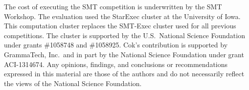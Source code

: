 \documentclass[smallcondensed]{svjour3}
\begin{document}
\begin{acknowledgements} 
 
The cost of executing the SMT competition is underwritten by the SMT
Workshop.  The evaluation used the StarExec cluster at the University
of Iowa.  This computation cluster replaces the SMT-Exec cluster used
for all previous competitions.  The cluster is supported by the
U.S.\ National Science Foundation under grants \#1058748 and \#1058925.  Cok's
contribution is supported by GrammaTech, Inc.\ and in part by the
National Science Foundation under grant ACI-1314674.  Any opinions,
findings, and conclusions or recommendations expressed in this
material are those of the authors and do not necessarily reflect the
views of the National Science Foundation.
\end{acknowledgements}
 


\end{document}
